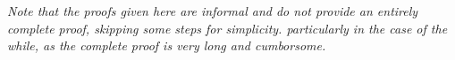 \textit{Note that the proofs given here are informal and do not provide an entirely complete proof, skipping some steps for simplicity. particularly in the case of the while, as the complete proof is very long and cumborsome.}

        
    
    
    


        

